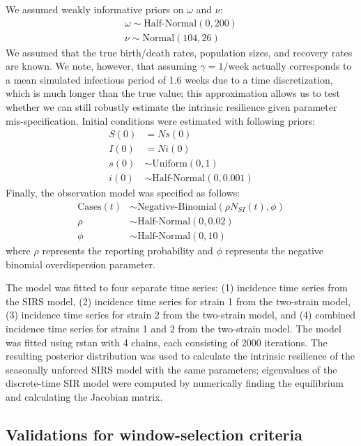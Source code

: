 \documentclass[12pt]{article}
\begin{document}
We assumed weakly informative priors on $\omega$ and $\nu$:
\begin{align}
\omega \sim \textrm{Half-Normal}(0, 200)\\
\nu \sim \mathrm{Normal}(104, 26)
\end{align}
We assumed that the true birth/death rates, population sizes, and recovery rates are known.
We note, however, that assuming $\gamma=1/\mathrm{week}$ actually corresponds to a mean simulated infectious period of 1.6 weeks due to a time discretization, which is much longer than the true value; this approximation allows us to test whether we can still robustly estimate the intrinsic resilience given parameter mis-specification.
Initial conditions were estimated with following priors:
\begin{align}
S(0) &= N s(0)\\
I(0) &= N i(0)\\
s(0) &\sim \textrm{Uniform}(0, 1)\\
i(0) &\sim \textrm{Half-Normal}(0, 0.001)
\end{align}
Finally, the observation model was specified as follows:
\begin{align}
\textrm{Cases}(t) &\sim \textrm{Negative-Binomial}(\rho N_{SI}(t), \phi)\\
\rho &\sim \textrm{Half-Normal}(0, 0.02)\\
\phi &\sim \textrm{Half-Normal}(0, 10)
\end{align}
where $\rho$ represents the reporting probability and $\phi$ represents the negative binomial overdispersion parameter.

The model was fitted to four separate time series: (1) incidence time series from the SIRS model, (2) incidence time series for strain 1 from the two-strain model, (3) incidence time series for strain 2 from the two-strain model, and (4) combined incidence time series for strains 1 and 2 from the two-strain model.
The model was fitted using rstan \citep{carpenter2017stan,rstan} with 4 chains, each consisting of 2000 iterations.
The resulting posterior distribution was used to calculate the intrinsic resilience of the seasonally unforced SIRS model with the same parameters;
eigenvalues of the discrete-time SIR model were computed by numerically finding the equilibrium and calculating the Jacobian matrix.

\subsection*{Validations for window-selection criteria}
\end{document}
